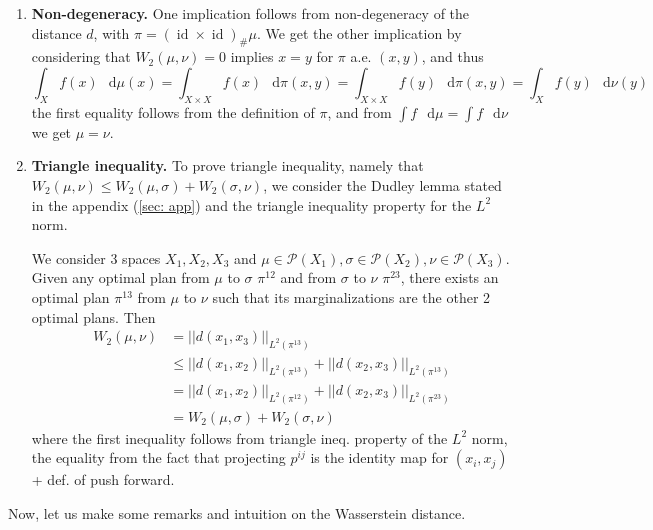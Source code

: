 \documentclass[a4paper,12pt,reqno]{amsbook}
\theoremstyle{definition} %
\newcommand*\de{\mathop{}\!\mathrm{d}}
\newcommand{\1}{\mathbbm{1}}
\newcommand{\mP}{\mathscr{P}}
\DeclareMathOperator*{\id}{id}
\theoremstyle{plain}
\theoremstyle{remark}
\begin{document}
\begin{enumerate}[label=($\roman*$)]


\item  \textbf{Non-degeneracy.} One implication follows from non-degeneracy of the distance $d$, with $\pi=(\id \times \id)_\# \mu$. We get the other implication by considering that $W_2(\mu,\nu)=0$ implies $x=y$ for $\pi$ a.e. $(x,y)$, and thus
\[
\int_X f(x) \, \de{\mu}(x) = \int_{X\times X} f(x) \, \de{\pi}(x,y) = \int_{X\times X} f(y) \, \de{\pi}(x,y) = \int_X f(y) \, \de{\nu}(y)
\]
the first equality follows from the definition of $\pi$, and from $\int f \, \de{\mu} = \int f \, \de{\nu}$ we get $\mu = \nu$. 

\item  \textbf{Triangle inequality.} To prove triangle inequality, namely that $W_2(\mu,\nu) \le W_2(\mu,\sigma) + W_2(\sigma,\nu)$, we consider the Dudley lemma stated in the appendix (\ref{sec: app}) and the triangle inequality property for the $L^2$ norm. 

We consider 3 spaces $X_1,X_2,X_3$ and $\mu \in \mP(X_1), \sigma \in \mP(X_2), \nu \in \mP(X_3)$. Given any optimal plan from $\mu$ to $\sigma$ $\pi^{12}$ and from $\sigma$ to $\nu$ $\pi^{23}$, there exists an optimal plan $\pi^{13}$ from $\mu$ to $\nu$ such that its marginalizations are the other 2 optimal plans. Then 
\begin{align*}
W_2(\mu,\nu)&= ||d(x_1,x_3)||_{L^2(\pi^{13})} \\&\le ||d(x_1,x_2)||_{L^2(\pi^{13})} + ||d(x_2,x_3)||_{L^2(\pi^{13})}\\& = ||d(x_1,x_2)||_{L^2(\pi^{12})} + ||d(x_2,x_3)||_{L^2(\pi^{23})}\\& = W_2(\mu,\sigma) + W_2(\sigma,\nu)
\end{align*}
where the first inequality follows from triangle ineq. property of the $L^2$ norm, the equality from the fact that projecting $p^{ij}$ is the identity map for $(x_i,x_j)$ + def. of push forward. 
\end{enumerate}

Now, let us make some remarks and intuition on the Wasserstein distance. 
\end{document}
